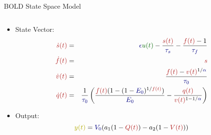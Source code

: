 \begin{frame}{BOLD State Space Model}
  \scriptsize
  \begin{columns}
  \begin{column}{.7\textwidth}
    \begin{itemize}
    \item State Vector:
    \begin{eqnarray}
    \color{mblue}\dot{s}(t) &=& {\color{mred}\epsilon} {\color{mgreen}u(t)} - 
                \frac{\color{mblue}s(t)}{\color{mred}\tau_s} - \frac{{\color{mblue}f(t)}-1}{\color{mred}\tau_f} \nonumber \\
    \color{mblue}\dot{f}(t) &=& \color{mblue}s \nonumber \\
    \color{mblue}\dot{v}(t) &=& \frac{{\color{mblue}f(t)} - 
                {\color{mblue}v(t)} ^ {1/{\color{mred}\alpha}}}{\color{mred}\tau_0} \nonumber \\
    \color{mblue}\dot{q}(t) &=& \frac{1}{\color{mred}\tau_0}
            \left(\frac{{\color{mblue}f(t)}(1-(1-{\color{mred}E_0})^{1/\color{mblue}f(t)})}{\color{mred}E_0} -
        \frac{\color{mblue}q(t)}{{\color{mblue}v(t)}^{1-1/\color{mred}\alpha}}\right) \nonumber 
    \end{eqnarray}
    \item Output:
    $${\color{myellow}y(t)} = {\color{mred}V_0}(a_1( 1 - {\color{mblue}Q(t)}) - a_2(1 - {\color{mblue}V(t)}))$$
    \end{itemize}
  \end{column}


\end{columns}
\end{frame}
